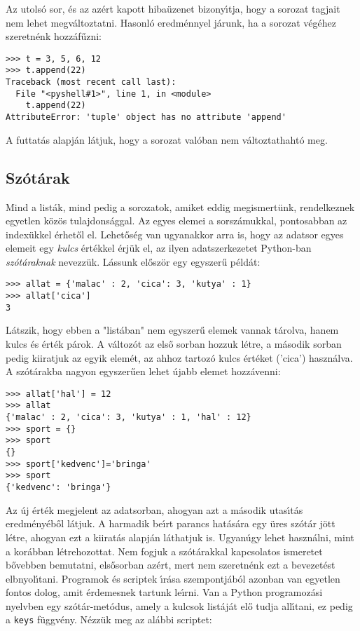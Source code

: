 \noindent Az utols\'o sor, \'es az az\'ert kapott hiba\"uzenet bizony\'{\i}tja, hogy a sorozat tagjait nem lehet 
megv\'altoztatni. Hasonl\'o eredm\'ennyel j\'arunk, ha a sorozat v\'eg\'ehez szeretn\'enk hozz\'af\H{u}zni: 

\begin{Verbatim}[fontsize=\small]
>>> t = 3, 5, 6, 12
>>> t.append(22)
Traceback (most recent call last):
  File "<pyshell#1>", line 1, in <module>
    t.append(22)
AttributeError: 'tuple' object has no attribute 'append'
\end{Verbatim}

A futtat\'as alapj\'an l\'atjuk, hogy a sorozat val\'oban nem v\'altoztathaht\'o meg.

\subsection{Sz\'ot\'arak}

Mind a list\'ak, mind pedig a sorozatok, amiket eddig megismert\"unk, rendelkeznek egyetlen k\"oz\"os tulajdons\'aggal. 
Az egyes elemei a sorsz\'amukkal, pontosabban az index\"ukkel \'erhet\H{o}l el. Lehet\H{o}s\'eg van ugyanakkor 
arra is, hogy az adatsor egyes elemeit egy {\sl kulcs} \'ert\'ekkel \'erj\"uk el, az ilyen adatszerkezetet Python-ban 
{\sl sz\'ot\'araknak} nevezz\"uk. L\'assunk el\H{o}sz\"or egy egyszer\H{u} p\'eld\'at:

\begin{Verbatim}[fontsize=\small]
>>> allat = {'malac' : 2, 'cica': 3, 'kutya' : 1}
>>> allat['cica']
3
\end{Verbatim}

L\'atszik, hogy ebben a "list\'aban" nem egyszer\H{u} elemek vannak t\'arolva, hanem kulcs \'es \'ert\'ek p\'arok. A 
v\'altoz\'ot az els\H{o} sorban hozzuk l\'etre, a m\'asodik sorban pedig kiiratjuk az egyik elem\'et, az ahhoz tartoz\'o 
kulcs \'ert\'eket ('cica') haszn\'alva. A sz\'ot\'arakba nagyon egyszer\H{u}en lehet \'ujabb elemet hozz\'avenni:

\begin{Verbatim}[fontsize=\small]
>>> allat['hal'] = 12
>>> allat
{'malac' : 2, 'cica': 3, 'kutya' : 1, 'hal' : 12}
>>> sport = {}
>>> sport
{}
>>> sport['kedvenc']='bringa'
>>> sport
{'kedvenc': 'bringa'}
\end{Verbatim}

Az \'uj \'ert\'ek megjelent az adatsorban, ahogyan azt a m\'asodik utas\'{\i}t\'as eredm\'e\-ny\'e\-b\H{o}l l\'atjuk. 
A harmadik be\'{\i}rt parancs hat\'as\'ara egy \"ures sz\'ot\'ar j\"ott l\'etre, ahogyan ezt a kiirat\'as alapj\'an 
l\'athatjuk is. Ugyan\'ugy lehet haszn\'alni, mint a kor\'abban l\'etrehozottat. Nem fogjuk a sz\'ot\'arakkal 
kapcsolatos ismeretet b\H{o}vebben bemutatni, els\H{o}sorban az\'ert, mert nem szeretn\'enk ezt a bevezet\'est 
elbnyol\'{\i}tani. Programok \'es scriptek \'{\i}r\'asa szempontj\'ab\'ol azonban van egyetlen fontos dolog, amit 
\'erdemesnek tartunk le\'{\i}rni. Van a Python programoz\'asi nyelvben egy sz\'ot\'ar-met\'odus, amely a kulcsok 
list\'aj\'at el\H{o} tudja all\'{\i}tani, ez pedig a {\tt keys} f\"uggv\'eny. N\'ezz\"uk meg az al\'abbi scriptet:

